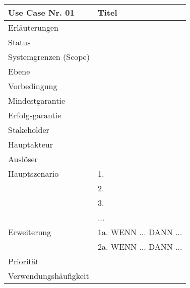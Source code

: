 \begin{tabularx}{\linewidth}{|l|X|}
	\hline
	Use Case Nr. 01			& \textbf{Titel} \\ \hline
	Erläuterungen					&  \\ \hline
	Status					&  \\ \hline
	Systemgrenzen (Scope)			&  \\ \hline
	Ebene					&  \\ \hline
	Vorbedingung					&  \\ \hline
	Mindestgarantie					&  \\ \hline
	Erfolgsgarantie					&  \\ \hline
	Stakeholder				&  \\ \hline
	Hauptakteur				&  \\ \hline
	Auslöser				&  \\ \hline	
	Hauptszenario			&  1. \\
							& 2. \\
							& 3.\\
							& ... \\ \hline
	Erweiterung				& 1a. WENN ... DANN ... \\ 
							& 2a. WENN ... DANN ... \\ \hline
	Priorität			&  \\ \hline
	Verwendungshäufigkeit				&  \\ \hline
\end{tabularx}
